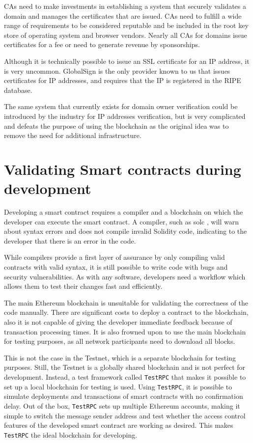 CAs need to make investments in establishing a system that securely validates a domain and manages the certificates that are issued. CAs need to fulfill a wide range of requirements \cite{BaselineRequirements} to be considered reputable and be included in the root key store of operating system and browser vendors. Nearly all CAs for domains issue certificates for a fee or need to generate revenue by sponsorships.

Although it is technically possible to issue an SSL certificate for an IP address, it is very uncommon. GlobalSign \cite{GlobalSign} is the only provider known to us that issues certificates for IP addresses, and requires that the IP is registered in the RIPE database.

The same system that currently exists for domain owner verification could be introduced by the industry for IP addresses verification, but is very complicated and defeats the purpose of using the blockchain as the original idea was to remove the need for additional infrastructure.

\section{Validating Smart contracts during development}
Developing a smart contract requires a compiler and a blockchain on which the developer can execute the smart contract. A compiler, such as solc \cite{Solc}, will warn about syntax errors and does not compile invalid Solidity code, indicating to the developer that there is an error in the code.

While compilers provide a first layer of assurance by only compiling valid contracts with valid syntax, it is still possible to write code with bugs and security vulnerabilities. As with any software, developers need a workflow which allows them to test their changes fast and efficiently.

The main Ethereum blockchain is unsuitable for validating the correctness of the code manually. There are significant costs to deploy a contract to the blockchain, also it is not capable of giving the developer immediate feedback because of transaction processing times. It is also frowned upon to use the main blockchain for testing purposes, as all network participants need to download all blocks.

This is not the case in the Testnet, which is a separate blockchain for testing purposes. Still, the Testnet is a globally shared blockchain and is not perfect for development. Instead, a test framework called \texttt{TestRPC} that makes it possible to set up a local blockchain for testing is used. Using \texttt{TestRPC}, it is possible to simulate deployments and transactions of smart contracts with no confirmation delay. Out of the box, \texttt{TestRPC} sets up multiple Ethereum accounts, making it simple to switch the message sender address and test whether the access control features of the developed smart contract are working as desired. This makes \texttt{TestRPC} the ideal blockchain for developing.

